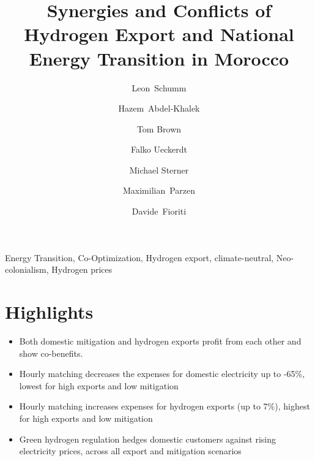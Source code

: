\documentclass[5p]{elsarticle}
\begin{document}
\begin{frontmatter}

	\title{Synergies and Conflicts of Hydrogen Export and National Energy Transition in Morocco}
    
	\author[tub,oth]{Leon~Schumm}
	\author[ieg]{Hazem~Abdel-Khalek}
	\author[tub]{Tom Brown}
	\author[pik]{Falko Ueckerdt}
	\author[oth]{Michael Sterner}
	\author[uoe]{Maximilian~Parzen}
	\author[unipi]{Davide~Fioriti}


	\address[tub]{Department of Digital Transformation in Energy Systems, Institute of Energy Technology, Technische Universität Berlin, Fakultät III, Einsteinufer 25 (TA 8), 10587 Berlin, Germany}
	\address[oth]{Research Center on Energy Transmission and Storage (FENES), Faculty of Electrical and Information Technology, University of Applied Sciences (OTH) Regensburg, Seybothstrasse 2, 93053 Regensburg, Germany}
	\address[ieg]{Fraunhofer Research Institution for Energy Infrastructures and Geothermal Systems IEG, Cottbus, Germany}
	\address[pik]{Potsdam Institute for Climate Impact Research (PIK), Potsdam, Germany}
	\address[uoe]{University of Edinburgh, Institute for Energy Systems, EH9 3DW Edinburgh, United Kingdom}
	\address[unipi]{University of Pisa, Department of Energy, Systems, Territory and Construction Engineering, Largo Lucio Lazzarino, 56122 Pisa, Italy}

	\begin{abstract}
		
	\end{abstract}

	\begin{keyword}
		Energy Transition, Co-Optimization, Hydrogen export, climate-neutral, Neo-colonialism, Hydrogen prices
	\end{keyword}




\end{frontmatter}



\section*{Highlights}

\begin{itemize}
	\item Both domestic mitigation and hydrogen exports profit from each other and show co-benefits.
	\item Hourly matching decreases the expenses for domestic electricity up to -65\%, lowest for high exports and low mitigation 
	\item Hourly matching increases expenses for hydrogen exports (up to 7\%), highest for high exports and low mitigation 
	\item Green hydrogen regulation hedges domestic customers against rising electricity prices, across all export and mitigation scenarios
\end{itemize}
\end{document}
